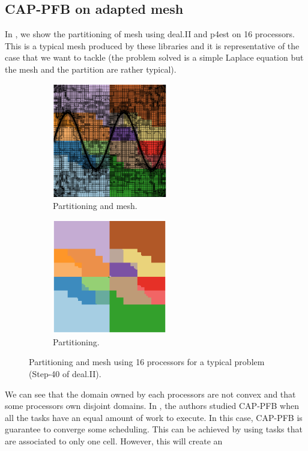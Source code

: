 \documentclass[letterpaper]{article}
\renewcommand{\(}{\left(}
\renewcommand{\)}{\right)}
\renewcommand{\[}{\left[}
\renewcommand{\]}{\right]}
\begin{document}
\subsection{CAP-PFB on adapted mesh}
In , we show the partitioning of mesh using deal.II and p4est 
on 16 processors. This is a typical mesh produced by these libraries and it is
representative of the case that we want to tackle (the problem solved is a
simple Laplace equation but the mesh and the partition are rather typical). 
\begin{figure}[H]
  \begin{subfigure}[b]{.5\textwidth}
    \centering
    \includegraphics[width=5cm]{subdomain_id_0}
    \caption{Partitioning and mesh.}
  \end{subfigure}
  \begin{subfigure}[b]{.5\textwidth}
    \centering
    \includegraphics[width=5cm]{subdomain_id_1}
    \caption{Partitioning.}
  \end{subfigure}
  \caption{Partitioning and mesh using 16 processors for a typical problem
  (Step-40 of deal.II).}
  \label{subdomain_id}
\end{figure}
We can see that the domain owned by each processors are not convex and that some
processors own disjoint domains. In \cite{Mo2014}, the authors studied CAP-PFB
when all the tasks have an equal amount of work to execute. In this case,
CAP-PFB is guarantee to converge some scheduling. This can be achieved by using
tasks that are associated to only one cell. However, this will create an
\end{document}
